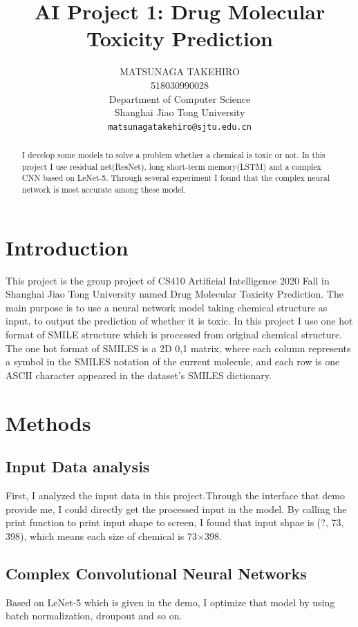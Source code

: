 \documentclass{article}
\title{AI Project 1: Drug Molecular Toxicity Prediction}
\author{
MATSUNAGA TAKEHIRO \\
518030990028\\
Department of Computer Science\\
Shanghai Jiao Tong University\\
\texttt{matsunagatakehiro@sjtu.edu.cn} \\
}
\begin{document}
\maketitle

\begin{abstract}
 I develop some models to solve a problem whether a chemical is toxic or not. In this project I use residual net(ResNet), long short-term memory(LSTM) and a complex CNN based on LeNet-5. Through several experiment I found that the complex neural network is most accurate among these model.
\end{abstract}

\section{Introduction}
This project is the group project of CS410 Artificial Intelligence 2020 Fall in Shanghai Jiao Tong University named Drug Molecular Toxicity Prediction. The main purpose is to use a neural network model taking chemical structure as input, to output the prediction of whether it is toxic. In this project I use one hot format of SMILE structure which is processed from original chemical structure. The one hot format of SMILES is a 2D {0,1} matrix, where each column represents a symbol in the SMILES notation of the current molecule, and each row is one ASCII character appeared in the dataset’s SMILES dictionary.


\section{Methods}
\subsection{Input Data analysis}
First, I analyzed the input data in this project.Through the interface that demo provide me, I could directly get the processed input in the model. By calling the print function to print input shape to screen, I found that input shpae is (?, 73, 398), which means each size of chemical is 73$\times$398. 

\subsection{Complex Convolutional Neural Networks}
Based on LeNet-5 which is given in the demo, I optimize that model by using batch normalization, droupout and so on. 
\end{document}
